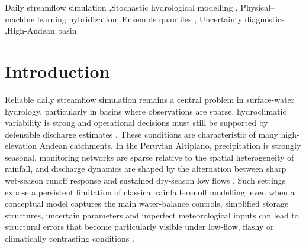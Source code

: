\documentclass[a4paper,fleqn]{cas-sc}
\begin{document}
\begin{keywords}
Daily streamflow simulation \sep Stochastic hydrological modelling \sep
Physical--machine learning hybridization \sep Ensemble quantiles \sep
Uncertainty diagnostics \sep High-Andean basin
\end{keywords}

\maketitle

\section{Introduction}\label{sec:introduction}

Reliable daily streamflow simulation remains a central problem in
surface-water hydrology, particularly in basins where observations are
sparse, hydroclimatic variability is strong and operational decisions
must still be supported by defensible discharge estimates
\citep{razavi2013streamflow,guo2021regionalization}. These conditions
are characteristic of many high-elevation Andean catchments. In the
Peruvian Altiplano, precipitation is strongly seasonal, monitoring
networks are sparse relative to the spatial heterogeneity of rainfall,
and discharge dynamics are shaped by the alternation between sharp
wet-season runoff response and sustained dry-season low flows
\citep{condom2004transient,zubieta2018hydrological,lima2025modeling}.
Such settings expose a persistent limitation of classical
rainfall--runoff modelling: even when a conceptual model captures the
main water-balance controls, simplified storage structures, uncertain
parameters and imperfect meteorological inputs can lead to structural
errors that become particularly visible under low-flow, flashy or
climatically contrasting conditions
\citep{van2013influence,nauditt2017conceptual,ragettli2014evaluation}.
\end{document}

